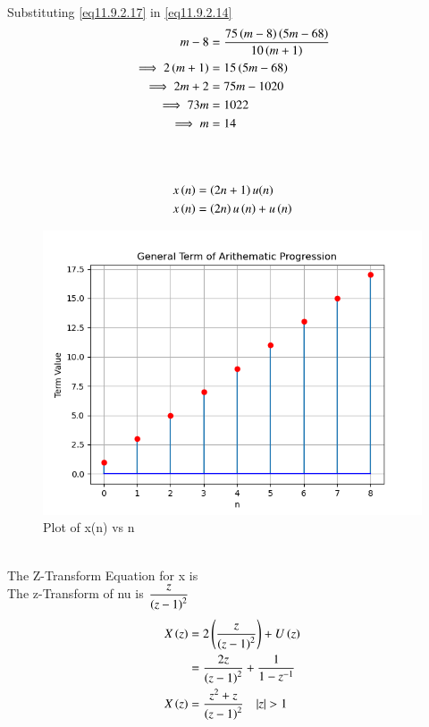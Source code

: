 \documentclass[journal,12pt,onecolumn]{IEEEtran}
\theoremstyle{remark}
\begin{document}
Substituting \eqref{eq11.9.2.17} in \eqref{eq11.9.2.14}\\
 \begin{align}
    m-8&=\frac{75\left(m-8\right)\left(5m-68\right)}{10\left(m+1\right)}\\
    \implies2\left(m+1\right)&=15\left(5m-68\right)\\
    \implies2m+2&=75m-1020\\
    \implies73m&=1022\\
    \implies m&=14
 \end{align}\\
  \\
\begin{align}
    x\left(n\right)&=\left(2n+1\right)u(n)\\
    x\left(n\right)&=\left(2n\right)u\left(n\right)+u\left(n\right)
\end{align}
\begin{figure}
    \centering
    \includegraphics[width=1.0\linewidth]{test.png}
    \caption{Plot of x(n) vs n}
    \label{fig:1}
\end{figure}\\
The Z-Transform Equation for x is\\
The z-Transform of nu is $\dfrac{z}{\left(z-1\right)^{2}}$\\
\begin{align}
    X\brak{z}&=2\brak{\dfrac{z}{\brak{z-1}^{2}}}+U\brak{z}\\
    &=\dfrac{2z}{\brak{z-1}^{2}}+\dfrac{1}{1-z^{-1}}\\
    X\brak{z}&=\dfrac{z^2+z}{\brak{z-1}^{2}} \quad{|z|>1}
\end{align}
\end{document}
